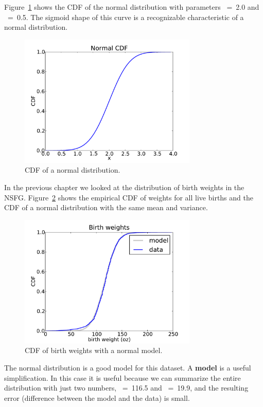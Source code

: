 \documentclass[12pt]{book}
\begin{document}
Figure~\ref{normal_cdf} shows the CDF of the normal distribution
with parameters \mymu~=~2.0 and \mysigma~=~0.5.  The sigmoid shape of
this curve is a recognizable characteristic of a normal distribution.

\begin{figure}
\centerline{\includegraphics[height=2.5in]{figs/normal_cdf.pdf}}
\caption{CDF of a normal distribution.}
\label{normal_cdf}
\end{figure}

In the previous chapter we looked at the distribution of birth
weights in the NSFG.  Figure~\ref{nsfg_birthwgt_model} shows the
empirical CDF of weights for all live births and the CDF of
a normal distribution with the same mean and variance.

\begin{figure}
\centerline{\includegraphics[height=2.5in]{figs/nsfg_birthwgt_model.pdf}}
\caption{CDF of birth weights with a normal model.}
\label{nsfg_birthwgt_model}
\end{figure}

The normal distribution is a good model for this dataset.  A {\bf
  model} is a useful simplification.  In this case it is useful
because we can summarize the entire distribution with just two
numbers, \mymu~=~116.5 and \mysigma~=~19.9, and the resulting error
(difference between the model and the data) is small.
\end{document}
